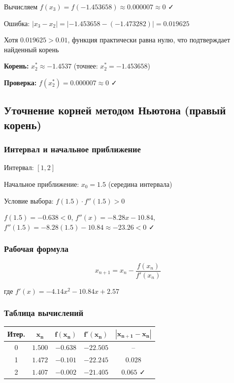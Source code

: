 \documentclass[a4paper,12pt]{article}
\begin{document}
Вычисляем $f(x_3) = f(-1.453658) \approx 0.000007 \approx 0$ ✓

Ошибка: $|x_3 - x_2| = |-1.453658 - (-1.473282)| = 0.019625$

Хотя $0.019625 > 0.01$, функция практически равна нулю, что подтверждает найденный корень

\textbf{Корень:} $x_2^* \approx -1.4537$ (точнее: $x_2^* = -1.453658$)

\textbf{Проверка:} $f(x_2^*) = 0.000007 \approx 0$ ✓

\newpage

\subsection{Уточнение корней методом Ньютона (правый корень)}

\subsubsection*{Интервал и начальное приближение}

Интервал: $[1, 2]$

Начальное приближение: $x_0 = 1.5$ (середина интервала)

Условие выбора: $f(1.5) \cdot f''(1.5) > 0$

$f(1.5) = -0.638 < 0$, $f''(x) = -8.28x - 10.84$, $f''(1.5) = -8.28(1.5) - 10.84 \approx -23.26 < 0$ ✓

\subsubsection*{Рабочая формула}
\[
    x_{n+1} = x_n - \frac{f(x_n)}{f'(x_n)}
\]

где $f'(x) = -4.14x^2 - 10.84x + 2.57$

\subsubsection*{Таблица вычислений}

\begin{center}
\begin{tabular}{|c|c|c|c|c|}
\hline
\textbf{Итер.} & $\mathbf{x_n}$ & $\mathbf{f(x_n)}$ & $\mathbf{f'(x_n)}$ & $\mathbf{|x_{n+1} - x_n|}$ \\
\hline
0 & $1.500$ & $-0.638$ & $-22.505$ & -- \\
\hline
1 & $1.472$ & $-0.101$ & $-22.245$ & $0.028$ \\
\hline
2 & $1.407$ & $-0.002$ & $-21.405$ & $0.065$ ✓ \\
\hline
\end{tabular}
\end{center}
\end{document}
